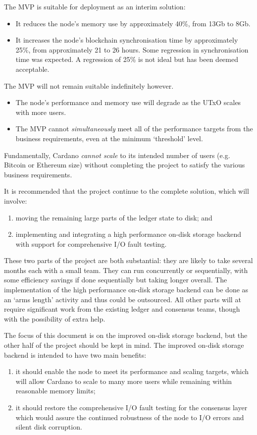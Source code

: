 \documentclass[11pt,a4paper]{article}
\begin{document}
The MVP is suitable for deployment as an interim solution:
\begin{itemize}
\item It reduces the node's memory use by approximately 40\%, from 13Gb to 8Gb.
\item It increases the node's blockchain synchronisation time by approximately
      25\%, from approximately 21 to 26 hours. Some regression in
      synchronisation time was expected. A regression of 25\% is not ideal but
      has been deemed acceptable.
\end{itemize}
The MVP will not remain suitable indefinitely however.
\begin{itemize}
\item The node's performance and memory use will degrade as the UTxO scales
      with more users.
\item The MVP cannot \emph{simultaneously} meet all of the performance targets
      from the business requirements, even at the minimum `threshold' level.
\end{itemize}
Fundamentally, Cardano \emph{cannot scale} to its intended number of users
(e.g. Bitcoin or Ethereum size) without completing the project to satisfy the
various business requirements.

It is recommended that the project continue to the complete solution, which
will involve:
\begin{enumerate}
\item moving the remaining large parts of the ledger state to disk; and
\item implementing and integrating a high performance on-disk storage backend
      with support for comprehensive I/O fault testing.
\end{enumerate}
These two parts of the project are both substantial: they are likely to take
several months each with a small team. They can run concurrently or
sequentially, with some efficiency savings if done sequentially but taking
longer overall. The implementation of the high performance on-disk storage
backend can be done as an `arms length' activity and thus could be outsourced.
All other parts will at require significant work from the existing ledger and
consensus teams, though with the possibility of extra help.

The focus of this document is on the improved on-disk storage backend, but
the other half of the project should be kept in mind. The improved on-disk
storage backend is intended to have two main benefits:
\begin{enumerate}
\item it should enable the node to meet its performance and scaling targets,
      which will allow Cardano to scale to many more users while remaining
      within reasonable memory limits;
\item it should restore the comprehensive I/O fault testing for the consensus
      layer which would assure the continued robustness of the node to I/O
      errors and silent disk corruption.
\end{enumerate}
\end{document}
